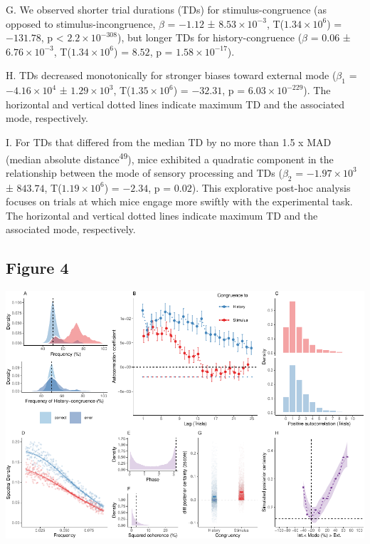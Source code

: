 \documentclass[
]{article}
\begin{document}
G. We observed shorter trial durations (TDs) for stimulus-congruence (as
opposed to stimulus-incongruence, \(\beta\) = \(-1.12\) ±
\(\ensuremath{8.53\times 10^{-3}}\),
T(\(\ensuremath{1.34\times 10^{6}}\)) = \(-131.78\), p < \(\ensuremath{2.2\times 10^{-308}}\)), but
longer TDs for history-congruence (\(\beta\) = \(0.06\) ±
\(\ensuremath{6.76\times 10^{-3}}\),
T(\(\ensuremath{1.34\times 10^{6}}\)) = \(8.52\), p =
\(\ensuremath{1.58\times 10^{-17}}\)).

H. TDs decreased monotonically for stronger biases toward external mode
(\(\beta_1\) = \(\ensuremath{-4.16\times 10^{4}}\) ±
\(\ensuremath{1.29\times 10^{3}}\),
T(\(\ensuremath{1.35\times 10^{6}}\)) = \(-32.31\), p =
\(\ensuremath{6.03\times 10^{-229}}\)). The horizontal and vertical
dotted lines indicate maximum TD and the associated mode, respectively.

I. For TDs that differed from the median TD by no more than 1.5 x MAD
(median absolute distance\textsuperscript{49}), mice exhibited a
quadratic component in the relationship between the mode of sensory
processing and TDs (\(\beta_2\) = \(\ensuremath{-1.97\times 10^{3}}\) ±
\(843.74\), T(\(\ensuremath{1.19\times 10^{6}}\)) = \(-2.34\), p =
\(0.02\)). This explorative post-hoc analysis focuses on trials at which
mice engage more swiftly with the experimental task. The horizontal and
vertical dotted lines indicate maximum TD and the associated mode,
respectively.

\newpage

\hypertarget{figure-4}{%
\subsection{Figure 4}\label{figure-4}}

\includegraphics{modes_mouse_rev1b_files/figure-latex/Figure_4-1.pdf}
\end{document}
